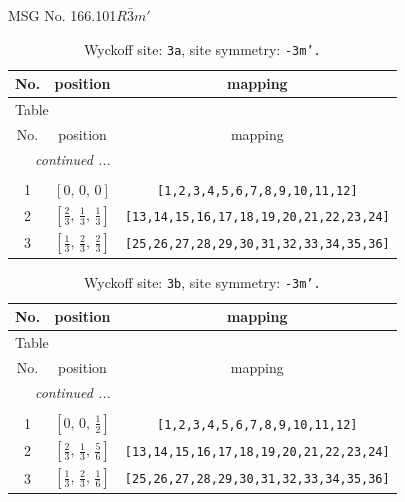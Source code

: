\documentclass[fleqn,8pt]{jsarticle}
\begin{document}
\setcounter{MaxMatrixCols}{32}

\renewcommand{\tablename}{Table~}
\renewcommand{\figurename}{Figure~}
\begin{center}
\LARGE
MSG No. 166.101\quad$R\bar{3}m'$
\end{center}
\renewcommand{\arraystretch}{1.2}
\begin{longtable}{ccc}
\caption{Wyckoff site: {\tt 3a}, site symmetry: {\tt -3m'.}}
 \\
 \hline \hline
No. & position & mapping \\ \hline \endfirsthead

\multicolumn{2}{l}{\tablename\ \thetable{}} \\
 \hline \hline
No. & position & mapping \\ \hline \endhead

 \hline \hline
\multicolumn{2}{r}{\footnotesize\it continued ...} \\ \endfoot

 \hline \hline
\multicolumn{2}{r}{} \\ \endlastfoot

1 & $\left[ 0,\, 0,\, 0 \right]$ & {\tt [1,2,3,4,5,6,7,8,9,10,11,12]} \\ \hline
2 & $\left[ \frac{2}{3},\, \frac{1}{3},\, \frac{1}{3} \right]$ & {\tt [13,14,15,16,17,18,19,20,21,22,23,24]} \\ \hline
3 & $\left[ \frac{1}{3},\, \frac{2}{3},\, \frac{2}{3} \right]$ & {\tt [25,26,27,28,29,30,31,32,33,34,35,36]} \\
\end{longtable}
\renewcommand{\arraystretch}{1.2}
\begin{longtable}{ccc}
\caption{Wyckoff site: {\tt 3b}, site symmetry: {\tt -3m'.}}
 \\
 \hline \hline
No. & position & mapping \\ \hline \endfirsthead

\multicolumn{2}{l}{\tablename\ \thetable{}} \\
 \hline \hline
No. & position & mapping \\ \hline \endhead

 \hline \hline
\multicolumn{2}{r}{\footnotesize\it continued ...} \\ \endfoot

 \hline \hline
\multicolumn{2}{r}{} \\ \endlastfoot

1 & $\left[ 0,\, 0,\, \frac{1}{2} \right]$ & {\tt [1,2,3,4,5,6,7,8,9,10,11,12]} \\ \hline
2 & $\left[ \frac{2}{3},\, \frac{1}{3},\, \frac{5}{6} \right]$ & {\tt [13,14,15,16,17,18,19,20,21,22,23,24]} \\ \hline
3 & $\left[ \frac{1}{3},\, \frac{2}{3},\, \frac{1}{6} \right]$ & {\tt [25,26,27,28,29,30,31,32,33,34,35,36]} \\
\end{longtable}
\end{document}
